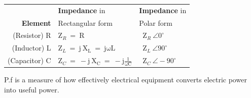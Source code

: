 \documentclass[12pt]{article}
\begin{document}
\vspace{1ex}
\begin{center}
   \begin{tabular}{|r|l|l|}
      \hline
       & \textbf{Impedance} in & \textbf{Impedance} in\\[-1ex]
      \textbf{Element}&Rectangular form&Polar form\\\hline
     (Resistor) R & $\mathrm{Z}_R \ = \ \mathrm{R}$ & \ $\mathrm{Z}_R \ \angle 0^\circ$\\\hline
     (Inductor) L & $\mathrm{Z}_L \ = \ \mathrm{j\ X_L} \ = \ \mathrm{j \omega L}$ & \ $\mathrm{Z}_L \ \angle 90^\circ$\\\hline
     (Capacitor) C & $\mathrm{Z}_C \ = \ -\mathrm{j\ X_C} \ = \ -\mathrm{j} \frac{1}{\mathrm{\omega C}}$ & \ $\mathrm{Z}_C \ \angle -90^\circ$\\[0.8ex]\hline
   \end{tabular}
\end{center}


\vspace{5ex}

\vspace{-0.5\baselineskip}
P.f is a measure of how effectively electrical equipment converts electric power into useful power.
\vspace{3ex}
\end{document}
